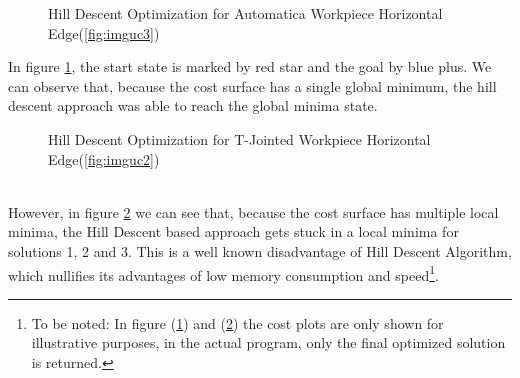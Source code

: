 \begin{figure}[!ht] %
	\centering
	\caption{Hill Descent Optimization for Automatica Workpiece Horizontal Edge(\ref{fig:imguc3})}
	\label{fig:HD1}
\end{figure}
In figure \ref{fig:HD1}, the start state is marked by red star and the goal by blue plus. We can observe that, because the cost surface has a single global minimum, the hill descent approach was able to reach the global minima state.
\begin{figure}[!ht] %
	\centering
	\caption{Hill Descent Optimization for T-Jointed Workpiece Horizontal Edge(\ref{fig:imguc2})}
	\label{fig:HD2}
\end{figure}\\
However, in figure \ref{fig:HD2} we can see that, because the cost surface has multiple local minima, the Hill Descent based approach gets stuck in a local minima for solutions 1, 2 and 3. This is a well known disadvantage of Hill Descent Algorithm, which nullifies its advantages of low memory consumption and speed\footnote{\label{fn1}To be noted: In figure (\ref{fig:HD1}) and (\ref{fig:HD2}) the cost plots are only shown for illustrative purposes, in the actual program, only the final optimized solution is returned.}. 
